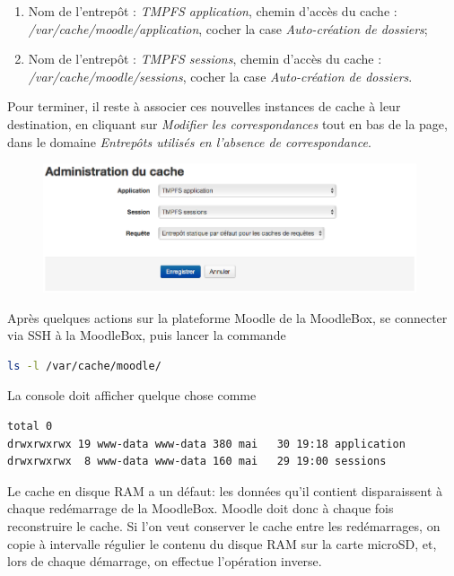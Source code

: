 \documentclass[11pt]{article}
\begin{document}
\begin{enumerate}
\item Nom de l'entrepôt : \emph{TMPFS application}, chemin d'accès du cache : \emph{/var/cache/moodle/application}, cocher la case \emph{Auto-création de dossiers};
\item Nom de l'entrepôt : \emph{TMPFS sessions}, chemin d'accès du cache : \emph{/var/cache/moodle/sessions}, cocher la case \emph{Auto-création de dossiers}.
\end{enumerate}

Pour terminer, il reste à associer ces nouvelles instances de cache à leur destination, en cliquant sur \emph{Modifier les correspondances} tout en bas de la page, dans le domaine \emph{Entrepôts utilisés en l'absence de correspondance}.

\begin{figure}[!ht]
\begin{minipage}[b]{\linewidth}
\centering
\includegraphics[width=11cm]{cache-association.png}
\end{minipage}
\end{figure}

\begin{verification}
Après quelques actions sur la plateforme Moodle de la MoodleBox, se connecter via SSH à la MoodleBox, puis lancer la commande
\begin{lstlisting}[language=bash]
ls -l /var/cache/moodle/
\end{lstlisting}
La console doit afficher quelque chose comme
\begin{lstlisting}[language=bash]
total 0
drwxrwxrwx 19 www-data www-data 380 mai   30 19:18 application
drwxrwxrwx  8 www-data www-data 160 mai   29 19:00 sessions
\end{lstlisting}
\end{verification}

Le cache en disque RAM a un défaut: les données qu'il contient disparaissent à chaque redémarrage de la MoodleBox. Moodle doit donc à chaque fois reconstruire le cache. Si l'on veut conserver le cache entre les redémarrages, on copie à intervalle régulier le contenu du disque RAM sur la carte microSD, et, lors de chaque démarrage, on effectue l'opération inverse.
\end{document}
